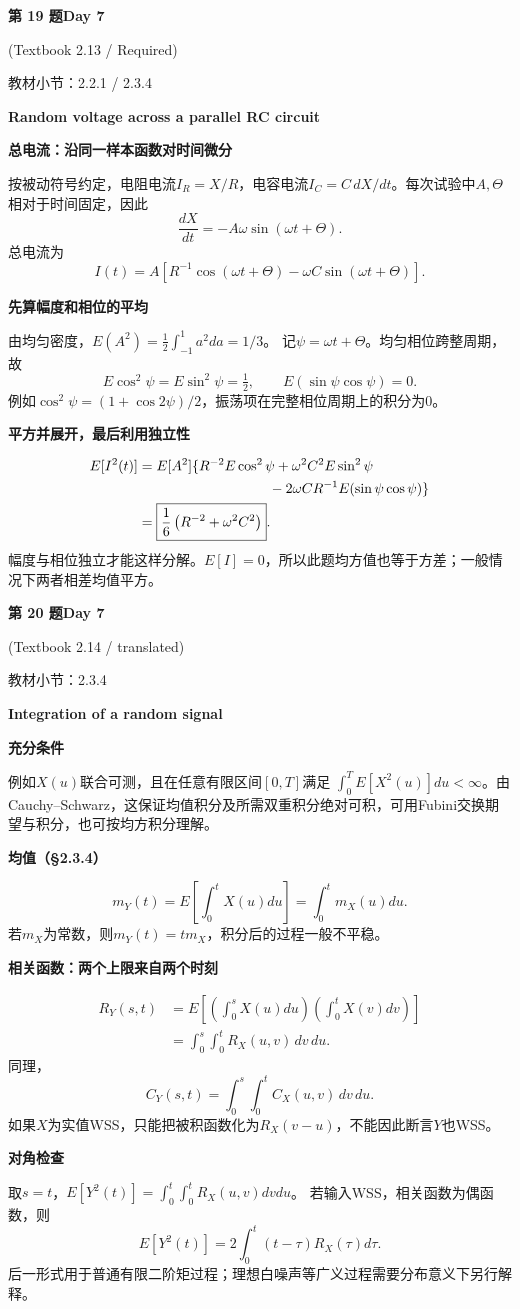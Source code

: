 \documentclass[10.5pt,fontset=fandol]{ctexart}
\newcommand{\key}[1]{\par\vspace{4pt}\noindent\textbf{\color{navy}#1}\par\vspace{2pt}}
\newcommand{\qtitle}[2]{\par\addvspace{1.2em}\Needspace{8\baselineskip}\begin{tcolorbox}[colback=navy,colframe=navy,arc=1.5pt,boxrule=0pt]\color{white}\large\bfseries #1\hfill\small #2\end{tcolorbox}}
\begin{document}
\qtitle{第 19 题}{Day 7}
{\small\color{accentred}(Textbook 2.13 / Required)}\par\smallskip
{\small\color{muted}教材小节：2.2.1 / 2.3.4}\par\medskip
\noindent\textbf{Random voltage across a parallel RC circuit}\par\smallskip\begin{tcolorbox}[breakable,colback=qbg,colframe=qbg,boxrule=0pt]\key{总电流：沿同一样本函数对时间微分}
按被动符号约定，电阻电流$I_R=X/R$，电容电流$I_C=C\,dX/dt$。每次试验中$A,\Theta$相对于时间固定，因此
\[\frac{dX}{dt}=-A\omega\sin(\omega t+\Theta).\]
总电流为
\[\boxed{I(t)=A\left[R^{-1}\cos(\omega t+\Theta)-\omega C\sin(\omega t+\Theta)\right].}\]
\key{先算幅度和相位的平均}
由均匀密度，$E(A^2)=\tfrac12\int_{-1}^1a^2da=1/3$。
记$\psi=\omega t+\Theta$。均匀相位跨整周期，故
\[E\cos^2\psi=E\sin^2\psi=\tfrac12,\qquad E(\sin\psi\cos\psi)=0.\]
例如$\cos^2\psi=(1+\cos2\psi)/2$，振荡项在完整相位周期上的积分为0。
\key{平方并展开，最后利用独立性}
\[\begin{aligned}E[I^2(t)]&=E[A^2]\{R^{-2}E\cos^2\psi+\omega^2C^2E\sin^2\psi\\&\hspace{33mm}-2\omega CR^{-1}E(\sin\psi\cos\psi)\}\\
&=\boxed{\frac16\left(R^{-2}+\omega^2C^2\right)}.\end{aligned}\]
幅度与相位独立才能这样分解。$E[I]=0$，所以此题均方值也等于方差；一般情况下两者相差均值平方。

\end{tcolorbox}
\qtitle{第 20 题}{Day 7}
{\small\color{accentred}(Textbook 2.14 / translated)}\par\smallskip
{\small\color{muted}教材小节：2.3.4}\par\medskip
\noindent\textbf{Integration of a random signal}\par\smallskip\begin{tcolorbox}[breakable,colback=qbg,colframe=qbg,boxrule=0pt]\key{充分条件}
例如$X(u)$联合可测，且在任意有限区间$[0,T]$满足
$\int_0^T E[X^2(u)]du<\infty$。由Cauchy--Schwarz，这保证均值积分及所需双重积分绝对可积，可用Fubini交换期望与积分，也可按均方积分理解。
\key{均值（§2.3.4）}
\[\boxed{m_Y(t)=E\left[\int_0^tX(u)du\right]=\int_0^t m_X(u)du.}\]
若$m_X$为常数，则$m_Y(t)=tm_X$，积分后的过程一般不平稳。
\key{相关函数：两个上限来自两个时刻}
\[\begin{aligned}R_Y(s,t)&=E\left[\left(\int_0^s X(u)du\right)\left(\int_0^tX(v)dv\right)\right]\\
&=\boxed{\int_0^s\int_0^t R_X(u,v)\,dv\,du}.\end{aligned}\]
同理，
\[C_Y(s,t)=\int_0^s\int_0^t C_X(u,v)\,dv\,du.\]
如果$X$为实值WSS，只能把被积函数化为$R_X(v-u)$，不能因此断言$Y$也WSS。
\key{对角检查}
取$s=t$，$E[Y^2(t)]=\int_0^t\int_0^tR_X(u,v)dvdu$。
若输入WSS，相关函数为偶函数，则
\[E[Y^2(t)]=2\int_0^t(t-\tau)R_X(\tau)d\tau.\]
后一形式用于普通有限二阶矩过程；理想白噪声等广义过程需要分布意义下另行解释。

\end{tcolorbox}
\end{document}
